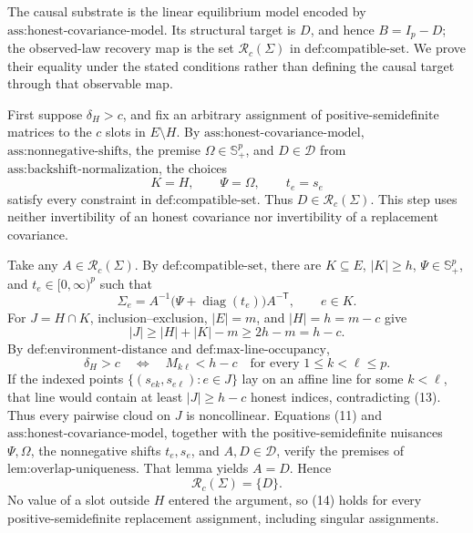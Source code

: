 The causal substrate is the linear equilibrium model encoded by \(\text{ass:honest-covariance-model}\).  Its structural target is \(D\), and hence \(B=I_p-D\); the observed-law recovery map is the set \(\mathcal R_c(\Sigma)\) in \(\text{def:compatible-set}\).  We prove their equality under the stated conditions rather than defining the causal target through that observable map.

First suppose \(\delta_H>c\), and fix an arbitrary assignment of positive-semidefinite matrices to the \(c\) slots in \(E\setminus H\).  By \(\text{ass:honest-covariance-model}\), \(\text{ass:nonnegative-shifts}\), the premise \(\Omega\in\mathbb S_+^p\), and \(D\in\mathcal D\) from \(\text{ass:backshift-normalization}\), the choices
\[
 K=H,
 \qquad \Psi=\Omega,
 \qquad t_e=s_e
\]
satisfy every constraint in \(\text{def:compatible-set}\).  Thus \(D\in\mathcal R_c(\Sigma)\).  This step uses neither invertibility of an honest covariance nor invertibility of a replacement covariance.

Take any \(A\in\mathcal R_c(\Sigma)\).  By \(\text{def:compatible-set}\), there are \(K\subseteq E\), \(|K|\ge h\), \(\Psi\in\mathbb S_+^p\), and \(t_e\in[0,\infty)^p\) such that
\[
 \Sigma_e=A^{-1}\bigl(\Psi+\operatorname{diag}(t_e)\bigr)A^{-\mathsf T},
 \qquad e\in K.
 \tag{11}
\]
For \(J=H\cap K\), inclusion--exclusion, \(|E|=m\), and \(|H|=h=m-c\) give
\[
 |J|\ge |H|+|K|-m\ge2h-m=h-c.
 \tag{12}
\]
By \(\text{def:environment-distance}\) and \(\text{def:max-line-occupancy}\),
\[
 \delta_H>c
 \quad\Longleftrightarrow\quad
 M_{k\ell}<h-c
 \quad\text{for every }1\le k<\ell\le p.
 \tag{13}
\]
If the indexed points \(\{(s_{ek},s_{e\ell}):e\in J\}\) lay on an affine line for some \(k<\ell\), that line would contain at least \(|J|\ge h-c\) honest indices, contradicting (13).  Thus every pairwise cloud on \(J\) is noncollinear.  Equations (11) and \(\text{ass:honest-covariance-model}\), together with the positive-semidefinite nuisances \(\Psi,\Omega\), the nonnegative shifts \(t_e,s_e\), and \(A,D\in\mathcal D\), verify the premises of \(\text{lem:overlap-uniqueness}\).  That lemma yields \(A=D\).  Hence
\[
 \mathcal R_c(\Sigma)=\{D\}.
 \tag{14}
\]
No value of a slot outside \(H\) entered the argument, so (14) holds for every positive-semidefinite replacement assignment, including singular assignments.

